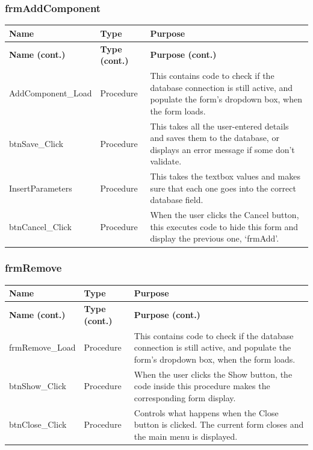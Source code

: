 	\subsubsection{frmAddComponent}
	\begin{longtable}{ | p{4cm} | p{3cm} | p{10cm} | }
		\hline
		\textbf{Name} & \textbf{Type} & \textbf{Purpose}\\
		\endfirsthead
		\hline
		\textbf{Name (cont.)} & \textbf{Type (cont.)} & \textbf{Purpose (cont.)}\\
		\endhead
		\hline
		AddComponent\_Load & Procedure & This contains code to check if the database connection is still active, and populate the form's dropdown box, when the form loads.\\
		\hline
		btnSave\_Click & Procedure & This takes all the user-entered details and saves them to the database, or displays an error message if some don't validate.\\
		\hline
		InsertParameters & Procedure & This takes the textbox values and makes sure that each one goes into the correct database field.\\
		\hline
		btnCancel\_Click & Procedure & When the user clicks the Cancel button, this executes code to hide this form and display the previous one, `frmAdd'.\\
		\hline
	\end{longtable}
	
	\subsubsection{frmRemove}
	
	\begin{longtable}{ | p{4cm} | p{3cm} | p{10cm} | }
		\hline
		\textbf{Name} & \textbf{Type} & \textbf{Purpose}\\
		\endfirsthead
		\hline
		\textbf{Name (cont.)} & \textbf{Type (cont.)} & \textbf{Purpose (cont.)}\\
		\endhead
		\hline
		frmRemove\_Load & Procedure & This contains code to check if the database connection is still active, and populate the form's dropdown box, when the form loads.\\
		\hline
		btnShow\_Click & Procedure & When the user clicks the Show button, the code inside this procedure makes the corresponding form display.\\
		\hline
		btnClose\_Click & Procedure & Controls what happens when the Close button is clicked.  The current form closes and the main menu is displayed.\\
		\hline
	\end{longtable}
	
